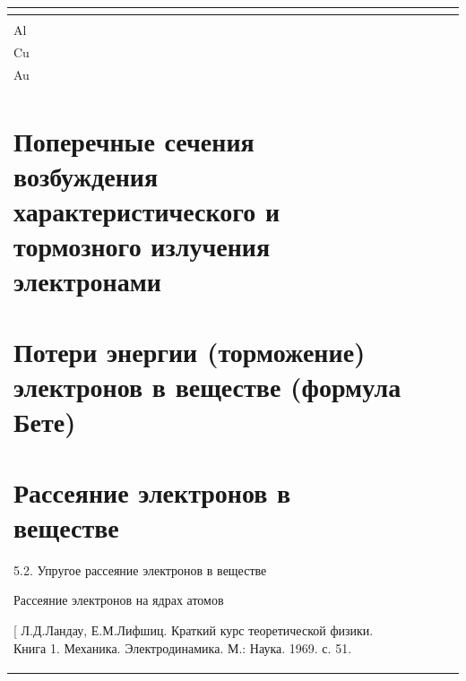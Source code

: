 \documentclass[a4paper,14pt, openany, twoside, draft]{extbook} %
\begin{document}
\begin{flushleft}
\tablefirsthead{}
\tablehead{}
\tabletail{}
\tablelasttail{}
\begin{supertabular}{|m{1.7279999cm}|m{1.522cm}|m{1.522cm}|m{1.522cm}|m{1.744cm}|}
\hline
{} &
 &
 &
\raggedleft{}\\\hline
{} &
 &
\\\hline
{ Al} &
 &
 &
 &
\raggedleft{}\\\hline
{ Cu} &
 &
 &
 &
\raggedleft{}\\\hline
{ Au} &
 &
 &
 &
\raggedleft{}\\\hline

\section{Поперечные сечения возбуждения характеристического и тормозного излучения электронами}
\label{sec:sections}

\section{Потери энергии (торможение) электронов в веществе (формула Бете)}
\section{Рассеяние электронов в веществе}
5.2. Упругое рассеяние электронов в веществе

Рассеяние электронов на ядрах атомов

[ Л.Д.Ландау, Е.М.Лифшиц. Краткий курс теоретической физики. Книга 1. Механика. Электродинамика. М.: Наука. 1969. с. 51.


\end{supertabular}
\end{flushleft}
\end{document}
